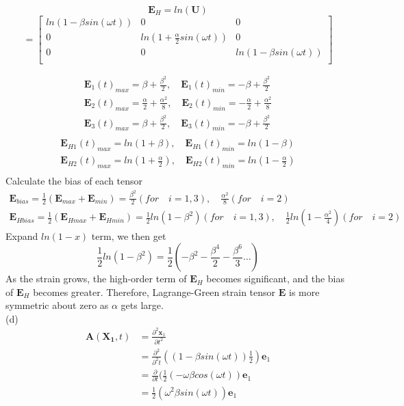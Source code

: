 \documentclass{elsarticle}
\begin{document}
\begin{equation*}
    \mathbf{E}_H=ln(\mathbf{U})
\end{equation*}
\begin{equation*}
    =\begin{bmatrix}
        ln(1-\beta sin(\omega t))&0&0\\
        0&ln(1+\frac{\alpha}{2}sin(\omega t))&0\\
        0&0&ln(1-\beta sin(\omega t))\\
    \end{bmatrix}
\end{equation*}

\begin{align*}
     \mathbf{E}_1(t)_{max} = \beta+\frac{\beta^2}{2}, \quad \mathbf{E}_1(t)_{min} = -\beta+\frac{\beta^2}{2}\\
     \mathbf{E}_2(t)_{max} = \frac{\alpha}{2}+\frac{\alpha^2}{8}, \quad \mathbf{E}_2(t)_{min} = -\frac{\alpha}{2}+\frac{\alpha^2}{8}\\
     \mathbf{E}_3(t)_{max} = \beta+\frac{\beta^2}{2}, \quad \mathbf{E}_3(t)_{min} = -\beta+\frac{\beta^2}{2}\\
\end{align*}
\begin{align*}
    \mathbf{E}_{H1}(t)_{max}=ln(1+\beta),\quad \mathbf{E}_{H1}(t)_{min}=ln(1-\beta)\\
    \mathbf{E}_{H2}(t)_{max}=ln(1+\frac{\alpha}{2}),\quad \mathbf{E}_{H2}(t)_{min}=ln(1-\frac{\alpha}{2})\\
\end{align*}
Calculate the bias of each tensor
\begin{align*}
    \mathbf{E}_{bias} = \frac{1}{2}(\mathbf{E}_{max}+\mathbf{E}_{min})=\frac{\beta^2}{2}(for\quad i=1,3), \quad \frac{\alpha^2}{8}(for\quad i=2)\\
    \mathbf{E}_{Hbias} = \frac{1}{2}(\mathbf{E}_{Hmax}+\mathbf{E}_{Hmin})=\frac{1}{2}ln(1-\beta^2)(for\quad i=1,3), \quad \frac{1}{2}ln(1-\frac{\alpha^2}{4})(for\quad i=2)
\end{align*}
Expand $ln(1-x)$ term, we then get
\begin{equation*}
    \frac{1}{2}ln(1-\beta^2)=\frac{1}{2}(-\beta^2-\frac{\beta^4}{2}-\frac{\beta^6}{3}\dots)
\end{equation*}
As the strain grows, the high-order term of $\mathbf{E}_H$ becomes significant, and the bias of $\mathbf{E}_H$ becomes greater. Therefore, Lagrange-Green strain tensor $\mathbf{E}$ is more symmetric about zero as $\alpha$ gets large.\\

(d)
\begin{align*}
    \mathbf{A}(\bm{X_1},t)&=\frac{\partial^2\bm{x}_1}{\partial t^2}\\
    &=\frac{\partial^2}{\partial^2t}((1-\beta sin(\omega t))\frac{1}{2})\bm{e}_1\\
    &=\frac{\partial}{\partial t}(\frac{1}{2}(-\omega\beta cos(\omega t))\bm{e}_1\\
    &=\frac{1}{2}(\omega^2\beta sin(\omega t))\bm{e}_1
\end{align*}
\end{document}
